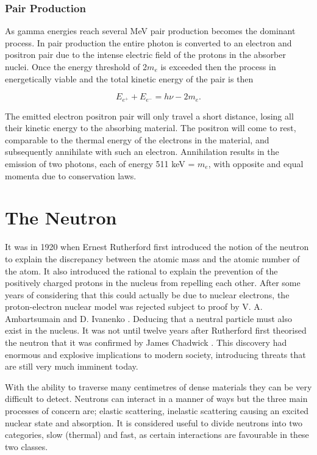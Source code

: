 \subsubsection{Pair Production}
As gamma energies reach several MeV pair production becomes the dominant process. In pair production the entire photon is converted to an electron and positron pair due to the intense electric field of the protons in the absorber nuclei. Once the energy threshold of 2$m_{e}$ is exceeded then the process in energetically viable and the total kinetic energy of the pair is then

\begin{equation}
E_{e^{+}} + E_{e^{-}} = h\nu - 2m_{e}.
\end{equation}

The emitted electron positron pair will only travel a short distance, losing all their kinetic energy to the absorbing material. The positron will come to rest, comparable to the thermal energy of the electrons in the material, and subsequently annihilate with such an electron. Annihilation results in the emission of two photons, each of energy 511 keV = $m_{e}$, with opposite and equal momenta due to conservation laws. 

\section{The Neutron}
It was in 1920 when Ernest Rutherford first introduced the notion of the neutron \cite{rutherfordNeutron} to explain the discrepancy between the atomic mass and the atomic number of the atom. It also introduced the rational to explain the prevention of the positively charged protons in the nucleus from repelling each other. After some years of considering that this could actually be due to nuclear electrons, the proton-electron nuclear model was rejected subject to proof by V. A. Ambartsumain and D. Ivanenko \cite{protonElectronNuclearModel}. Deducing that a neutral particle must also exist in the nucleus. It was not until twelve years after Rutherford first theorised the neutron that it was confirmed by James Chadwick \cite{Chadwick}. This discovery had enormous and explosive implications to modern society, introducing threats that are still very much imminent today.

With the ability to traverse many centimetres of dense materials they can be very difficult to detect. Neutrons can interact in a manner of ways but the three main processes of concern are; elastic scattering, inelastic scattering causing an excited nuclear state and absorption. It is considered useful to divide neutrons into two categories, slow (thermal) and fast, as certain interactions are favourable in these two classes.
